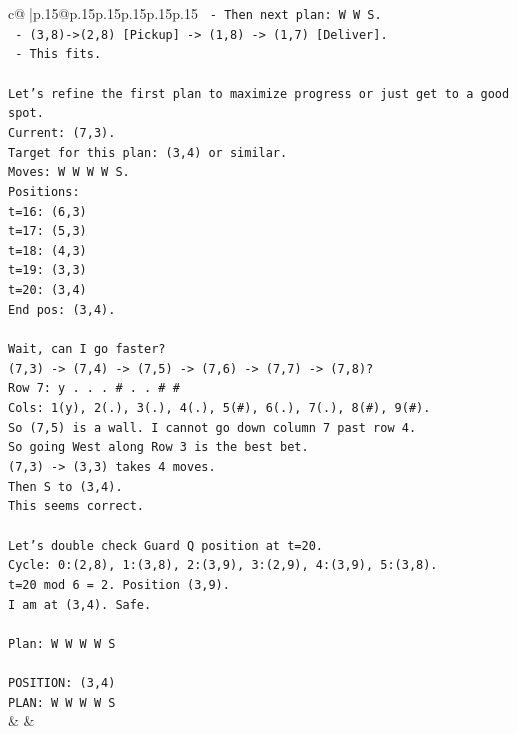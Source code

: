 \documentclass{article}
\begin{document}
{\begin{supertabular}{c@{$\;$}|p{.15\linewidth}@{}p{.15\linewidth}p{.15\linewidth}p{.15\linewidth}p{.15\linewidth}p{.15\linewidth}}
{{{\texttt{        {-} Then next plan: W W S.} \\
\texttt{        {-} (3,8){-}>(2,8) {[}Pickup{]} {-}> (1,8) {-}> (1,7) {[}Deliver{]}.} \\
\texttt{      {-} This fits.} \\
\\ 
\texttt{Let's refine the first plan to maximize progress or just get to a good spot.} \\
\texttt{Current: (7,3).} \\
\texttt{Target for this plan: (3,4) or similar.} \\
\texttt{Moves: W W W W S.} \\
\texttt{Positions:} \\
\texttt{t=16: (6,3)} \\
\texttt{t=17: (5,3)} \\
\texttt{t=18: (4,3)} \\
\texttt{t=19: (3,3)} \\
\texttt{t=20: (3,4)} \\
\texttt{End pos: (3,4).} \\
\\ 
\texttt{Wait, can I go faster?} \\
\texttt{(7,3) {-}> (7,4) {-}> (7,5) {-}> (7,6) {-}> (7,7) {-}> (7,8)?} \\
\texttt{Row 7: y . . . \# . . \# \#} \\
\texttt{Cols: 1(y), 2(.), 3(.), 4(.), 5(\#), 6(.), 7(.), 8(\#), 9(\#).} \\
\texttt{So (7,5) is a wall. I cannot go down column 7 past row 4.} \\
\texttt{So going West along Row 3 is the best bet.} \\
\texttt{(7,3) {-}> (3,3) takes 4 moves.} \\
\texttt{Then S to (3,4).} \\
\texttt{This seems correct.} \\
\\ 
\texttt{Let's double check Guard Q position at t=20.} \\
\texttt{Cycle: 0:(2,8), 1:(3,8), 2:(3,9), 3:(2,9), 4:(3,9), 5:(3,8).} \\
\texttt{t=20 mod 6 = 2. Position (3,9).} \\
\texttt{I am at (3,4). Safe.} \\
\\ 
\texttt{Plan: W W W W S} \\
\\ 
\texttt{POSITION: (3,4)} \\
\texttt{PLAN: W W W W S} \\
            }
        }
    }
    & & \\ \\


\end{supertabular}}
\end{document}
